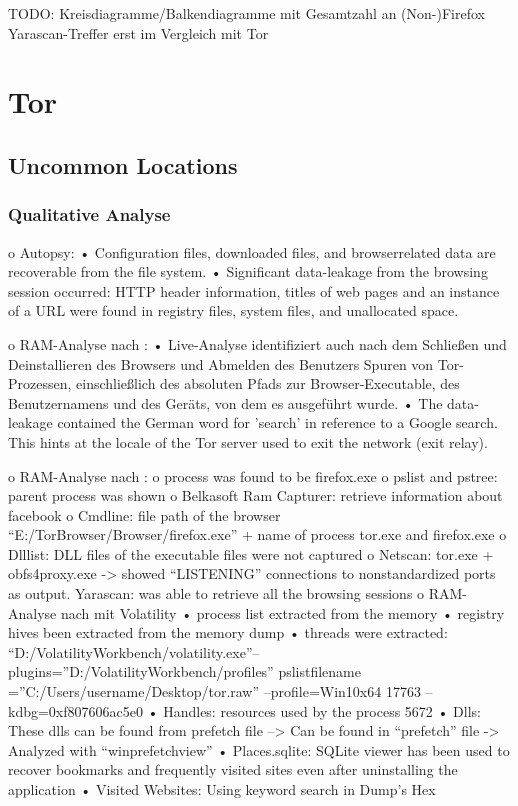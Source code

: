 TODO: Kreisdiagramme/Balkendiagramme mit Gesamtzahl an (Non-)Firefox Yarascan-Treffer erst im Vergleich mit Tor

\section{Tor}

\subsection*{Uncommon Locations}

\subsubsection*{Qualitative Analyse}

o Autopsy: \cite{Muir.2019}
	•	Configuration files, downloaded files, and browserrelated data are recoverable from the file system.
	•	Significant data-leakage from the browsing session occurred: HTTP header information, titles of web pages and an instance of a URL were found in registry files, system files, and unallocated space.



o RAM-Analyse nach \cite{Muir.2019}:
	•	Live-Analyse identifiziert auch nach dem Schließen und Deinstallieren des Browsers und Abmelden des Benutzers Spuren von Tor-Prozessen, einschließlich des absoluten Pfads zur Browser-Executable, des Benutzernamens und des Geräts, von dem es ausgeführt wurde.
	•	The data-leakage contained the German word for ’search’ in reference to a Google search. This hints at the locale of the Tor server used to exit the network (exit relay).

o RAM-Analyse nach \cite{Hariharan.2022}:
	o	process was found to be firefox.exe
	o	pslist and pstree: parent process was shown 
	o	Belkasoft Ram Capturer: retrieve information about facebook
	o	Cmdline: file path of the browser “E:/TorBrowser/Browser/firefox.exe” + name of process tor.exe and firefox.exe
	o	Dlllist: DLL files of the executable files were not captured
	o	Netscan: tor.exe + obfs4proxy.exe -> showed “LISTENING” connections to nonstandardized ports as output.
	Yarascan: was able to retrieve all the browsing sessions
o RAM-Analyse nach \cite{Sajan.2021} mit Volatility
	•	process list extracted from the memory
	•	registry hives been extracted from the memory dump
	•	threads were extracted: “D:/VolatilityWorkbench/volatility.exe”–plugins=”D:/VolatilityWorkbench/profiles” pslistfilename =”C:/Users/username/Desktop/tor.raw” –profile=Win10x64 17763 –kdbg=0xf807606ac5e0
	•	Handles: resources used by the process 5672
	•	Dlls: These dlls can be found from prefetch file --> Can be found in “prefetch” file -> Analyzed with “winprefetchview”
	•	Places.sqlite: SQLite viewer has been used to recover bookmarks and frequently visited sites even after uninstalling the application
	•	Visited Websites: Using keyword search in Dump’s Hex

